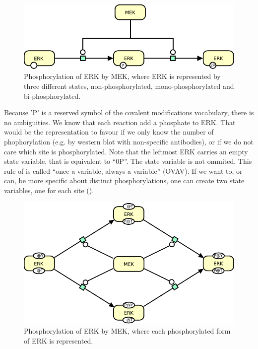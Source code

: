 \begin{figure}[H]
  \centering
  \includegraphics[scale = 1]{images/MAPK-OneVar}
  \caption{Phosphorylation of ERK by MEK, where ERK is represented by three different states, non-phosphorylated, mono-phosphorylated and bi-phosphorylated.}
  \label{fig:MAPK-OneVar}
\end{figure}

Because 'P' is a reserved symbol of the covalent modifications vocabulary, there is no ambiguities. We know that each reaction add a phosphate to ERK. That would be the representation to favour if we only know the number of phophorylation (e.g. by western blot with non-specific antibodies), or if we do not care which site is phosphorylated. Note that the leftmost ERK carries an empty state variable, that is equivalent to ``0P''. The state variable is not ommited. This rule of \SBGNPDLone is called ``once a variable, always a variable'' (OVAV).
If we want to, or can, be more specific about distinct phosphorylations, one can create two state variables, one for each site (). 

\begin{figure}[H]
  \centering
  \includegraphics[scale = 1]{images/MAPK-TwoVar}
  \caption{Phosphorylation of ERK by MEK, where each phosphorylated form of ERK is represented.}
  \label{fig:MAPK-TwoVar}
\end{figure}

